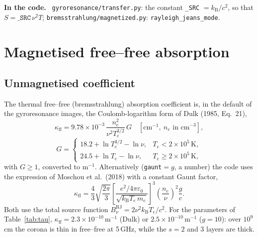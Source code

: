 \documentclass[11pt,a4paper]{article}
\newcommand{\code}[1]{\texttt{#1}}
\newcommand{\kB}{k_\mathrm{B}}
\newenvironment{incode}{\par\smallskip\noindent\begin{minipage}{\linewidth}\small\color{accent!80!black}\textbf{In the code.}~}{\end{minipage}\par\smallskip}
\begin{document}
\begin{incode}
\code{gyroresonance/transfer.py}: the constant \code{\_SRC} $=\kB/c^2$, so that
$S=\code{\_SRC}\,\nu^2T$; \code{bremsstrahlung/magnetized.py}: \code{rayleigh\_jeans\_mode}.
\end{incode}

\section{Magnetised free--free absorption}\label{sec:ff}

\subsection{Unmagnetised coefficient}
The thermal free--free (bremsstrahlung) absorption coefficient is, in the default of the
gyroresonance images, the Coulomb-logarithm form of Dulk (1985, Eq.~21),
\begin{equation}
  \kappa_\text{ff}=9.78\times10^{-3}\,\frac{n_e^2}{\nu^2T_e^{3/2}}\,G
  \quad[\text{cm}^{-1},\ n_e\text{ in cm}^{-3}],
  \label{eq:dulk}
\end{equation}
\begin{equation}
  G=\begin{cases}
     18.2+\ln T_e^{3/2}-\ln\nu, & T_e<2\times10^5\,\text{K},\\
     24.5+\ln T_e-\ln\nu, & T_e\ge2\times10^5\,\text{K},
    \end{cases}
\end{equation}
with $G\ge1$, converted to m$^{-1}$. Alternatively (\code{gaunt}$=g$, a number) the code uses
the expression of Moschou et al.\ (2018) with a constant Gaunt factor,
\begin{equation}
  \kappa_\text{ff}=\frac43\sqrt{\frac{2\pi}{3}}\left[\frac{e^2/4\pi\varepsilon_0}{\sqrt{\kB T_e\,m_e}}\right]^3
  \left(\frac{n_e}{\nu}\right)^2\frac{g}{c}.
\end{equation}
Both use the total source function $B_\nu^\text{RJ}=2\nu^2\kB T_e/c^2$. For the parameters of
Table~\ref{tab:tau}, $\kappa_\text{ff}=2.3\times10^{-10}$\,m$^{-1}$ (Dulk) or
$2.5\times10^{-10}$\,m$^{-1}$ ($g=10$): over $10^9$\,cm the corona is thin in free--free at 5\,GHz,
while the $s=2$ and 3 layers are thick.
\end{document}
